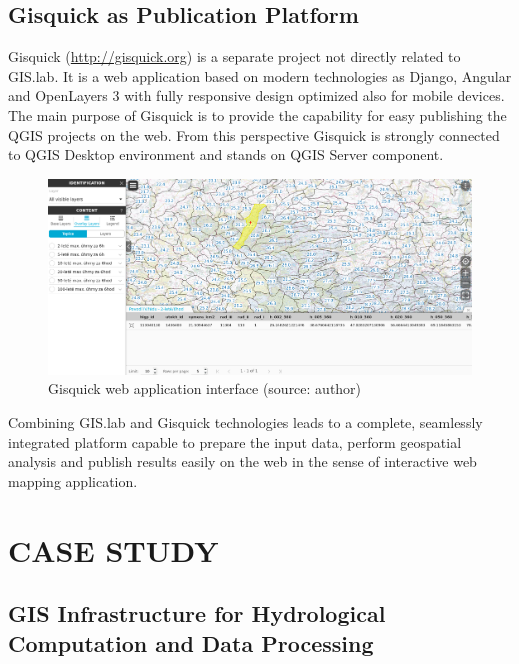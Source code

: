 \documentclass{isprs}
\begin{document}
\subsection{Gisquick as Publication Platform}

Gisquick (\url{http://gisquick.org}) is a separate project not
directly related to GIS.lab. It is a web application based on modern
technologies as Django, Angular and OpenLayers 3 with fully responsive
design optimized also for mobile devices. The main purpose of Gisquick
is to provide the capability for easy publishing the QGIS projects on
the web. From this perspective Gisquick is strongly connected to QGIS
Desktop environment and stands on QGIS Server component.

\begin{figure}[ht!]
\begin{center}
  \includegraphics[width=0.9\columnwidth]{figures/gisquick-identify.png}
  \caption{Gisquick web application interface
    (source: author)}
\label{fig:gislab_infrastructure}
\end{center}
\end{figure}

Combining GIS.lab and Gisquick technologies leads to a complete, seamlessly
integrated platform capable to prepare the input data, perform geospatial
analysis and publish results easily on the web in the sense of interactive
web mapping application.

\section{CASE STUDY}

\subsection{GIS Infrastructure for Hydrological Computation and
  Data Processing}\label{GIS Infrastructure for Hydrological Computation and
  Data Processing}
\end{document}
